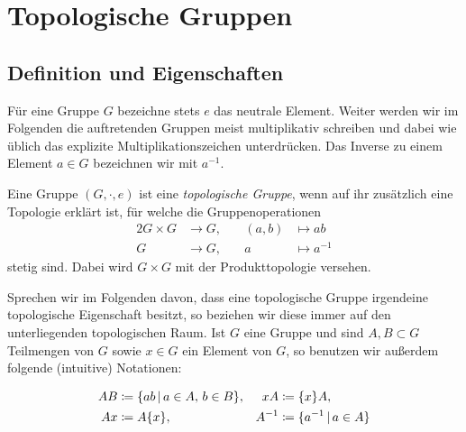 \chapter{Topologische Gruppen}
\section{Definition und Eigenschaften}
Für eine Gruppe $G$ bezeichne stets $e$ das neutrale Element. Weiter werden wir
im Folgenden die auftretenden Gruppen meist multiplikativ schreiben und dabei
wie üblich das explizite Multiplikationszeichen unterdrücken. Das Inverse zu
einem Element $a\in G$ bezeichnen wir mit $a^{-1}$.

\begin{thDef}
    Eine Gruppe $(G,\cdot, e)$ ist eine \emph{topologische Gruppe}, wenn auf ihr
    zusätzlich eine Topologie erklärt ist, für welche die Gruppenoperationen
    \begin{alignat*}{2}
        G \times G &\to G,  &\quad (a,b) &\mapsto ab
        \\
        G &\to G,           &\quad     a &\mapsto a^{-1}
    \end{alignat*}
    stetig sind. Dabei wird $G\times G$ mit der Produkttopologie versehen.
\end{thDef}

Sprechen wir im Folgenden davon, dass eine topologische Gruppe irgendeine
topologische Eigenschaft besitzt, so beziehen wir diese immer auf den
unterliegenden topologischen Raum.
Ist $G$ eine Gruppe und sind $A,B\subset G$ Teilmengen von $G$ sowie $x\in G$
ein Element von $G$, so benutzen wir außerdem folgende (intuitive) Notationen:
\begin{thNotation} 
    \begin{align*}
        AB &\defeq \{ ab \Mid a\in A,\, b\in B \},  &
        xA &\defeq \{x\}A,                          \\
        Ax &\defeq A\{x\},                          &
        A^{-1} &\defeq \{ a^{-1} \Mid a\in A \}     %
    \end{align*}
\end{thNotation}

